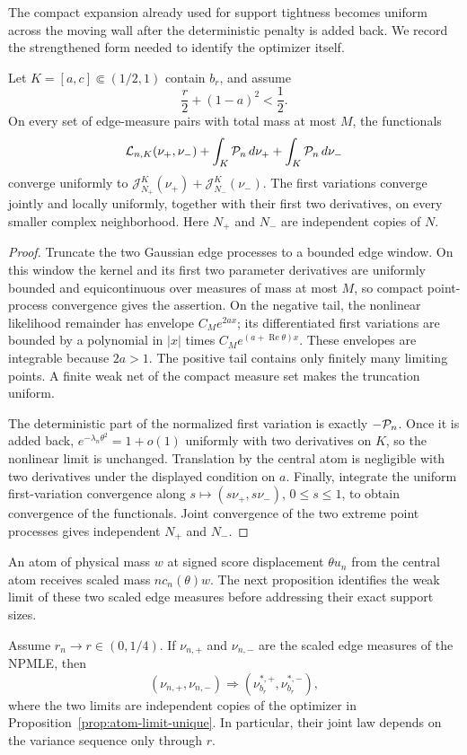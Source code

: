 The compact expansion already used for support tightness becomes uniform
across the moving wall after the deterministic penalty is added back. We
record the strengthened form needed to identify the optimizer itself.
\begin{lemma}
\label{lem:atom-wall-functional-convergence}
Let \(K=[a,c]\Subset(1/2,1)\) contain \(b_r\), and assume
\[
    \frac r2+(1-a)^2<\frac12.
\]
On every set of edge-measure pairs with total mass at most \(M\), the
functionals
\[
    \mathcal L_{n,K}(\nu_+,\nu_-)
    +\int_K\mathcal P_n\,d\nu_++\int_K\mathcal P_n\,d\nu_-
\]
converge uniformly to
\(\mathcal J_{N_+}^K(\nu_+)+\mathcal J_{N_-}^K(\nu_-)\). The first
variations converge jointly and locally uniformly, together with their first
two derivatives, on every smaller complex neighborhood. Here \(N_+\) and
\(N_-\) are independent copies of \(N\).
\end{lemma}

\begin{proof}
Truncate the two Gaussian edge processes to a bounded edge window. On this
window the kernel and its first two parameter derivatives are uniformly
bounded and equicontinuous over measures of mass at most \(M\), so compact
point-process convergence gives the assertion. On the negative tail, the
nonlinear likelihood remainder has envelope \(C_Me^{2ax}\); its
differentiated first variations are bounded by a polynomial in \(|x|\) times
\(C_Me^{(a+\operatorname{Re}\theta)x}\). These envelopes are integrable
because \(2a>1\). The positive tail contains only finitely many limiting
points. A finite weak net of the compact measure set makes the truncation
uniform.

The deterministic part of the normalized first variation is exactly
\(-\mathcal P_n\). Once it is added back,
\(e^{-\lambda_n\theta^2}=1+o(1)\) uniformly with two derivatives on \(K\),
so the nonlinear limit is unchanged. Translation by the central atom is
negligible with two derivatives under the displayed condition on \(a\).
Finally, integrate the uniform first-variation convergence along
\(s\mapsto(s\nu_+,s\nu_-)\), \(0\le s\le1\), to obtain convergence of the
functionals. Joint convergence of the two extreme point processes gives
independent \(N_+\) and \(N_-\).
\end{proof}

An atom of physical mass \(w\) at signed score displacement
\(\theta u_n\) from the central atom receives scaled mass
\(nc_n(\theta)w\). The next proposition identifies the weak limit of these
two scaled edge measures before addressing their exact support sizes.
\begin{proposition}
\label{prop:atom-measure-limit}
Assume \(r_n\to r\in(0,1/4)\). If \(\nu_{n,+}\) and \(\nu_{n,-}\) are the
scaled edge measures of the NPMLE, then
\[
    (\nu_{n,+},\nu_{n,-})
    \Rightarrow
    (\nu_{b_r}^{*,+},\nu_{b_r}^{*,-}),
\]
where the two limits are independent copies of the optimizer in
Proposition~\ref{prop:atom-limit-unique}. In particular, their joint law
depends on the variance sequence only through \(r\).
\end{proposition}

